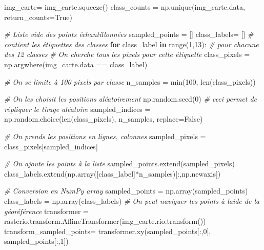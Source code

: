 \documentclass[
]{article}
\newenvironment{Shaded}{}{}
\newcommand{\BuiltInTok}[1]{\textcolor[rgb]{0.00,0.50,0.00}{#1}}
\newcommand{\CommentTok}[1]{\textcolor[rgb]{0.38,0.63,0.69}{\textit{#1}}}
\newcommand{\ControlFlowTok}[1]{\textcolor[rgb]{0.00,0.44,0.13}{\textbf{#1}}}
\newcommand{\DecValTok}[1]{\textcolor[rgb]{0.25,0.63,0.44}{#1}}
\newcommand{\KeywordTok}[1]{\textcolor[rgb]{0.00,0.44,0.13}{\textbf{#1}}}
\newcommand{\NormalTok}[1]{#1}
\newcommand{\OperatorTok}[1]{\textcolor[rgb]{0.40,0.40,0.40}{#1}}
\newcommand{\VariableTok}[1]{\textcolor[rgb]{0.10,0.09,0.49}{#1}}
\begin{document}
\label{a061c0ea}
\label{cb11}
\begin{Shaded}
\begin{Highlighting}[]
\NormalTok{img\_carte}\OperatorTok{=}\NormalTok{ img\_carte.squeeze()}
\NormalTok{class\_counts }\OperatorTok{=}\NormalTok{ np.unique(img\_carte.data, return\_counts}\OperatorTok{=}\VariableTok{True}\NormalTok{)}

\CommentTok{\# Liste vide des points échantillonnées}
\NormalTok{sampled\_points }\OperatorTok{=}\NormalTok{ []}
\NormalTok{class\_labels}\OperatorTok{=}\NormalTok{ [] }\CommentTok{\# contient les étiquettes des classes}
\ControlFlowTok{for}\NormalTok{ class\_label }\KeywordTok{in} \BuiltInTok{range}\NormalTok{(}\DecValTok{1}\NormalTok{,}\DecValTok{13}\NormalTok{): }\CommentTok{\# pour chacune des 12 classes}
  \CommentTok{\# On cherche tous les pixels pour cette étiquette}
\NormalTok{  class\_pixels }\OperatorTok{=}\NormalTok{ np.argwhere(img\_carte.data }\OperatorTok{==}\NormalTok{ class\_label)}

  \CommentTok{\# On se limite à 100 pixels par classe}
\NormalTok{  n\_samples }\OperatorTok{=} \BuiltInTok{min}\NormalTok{(}\DecValTok{100}\NormalTok{, }\BuiltInTok{len}\NormalTok{(class\_pixels))}

  \CommentTok{\# On les choisit les positions aléatoirement}
\NormalTok{  np.random.seed(}\DecValTok{0}\NormalTok{) }\CommentTok{\# ceci permet de répliquer le tirage aléatoire}
\NormalTok{  sampled\_indices }\OperatorTok{=}\NormalTok{ np.random.choice(}\BuiltInTok{len}\NormalTok{(class\_pixels), n\_samples, replace}\OperatorTok{=}\VariableTok{False}\NormalTok{)}

  \CommentTok{\# On prends les positions en lignes, colonnes}
\NormalTok{  sampled\_pixels }\OperatorTok{=}\NormalTok{ class\_pixels[sampled\_indices]}

  \CommentTok{\# On ajoute les points à la liste}
\NormalTok{  sampled\_points.extend(sampled\_pixels)}
\NormalTok{  class\_labels.extend(np.array([class\_label]}\OperatorTok{*}\NormalTok{n\_samples)[:,np.newaxis])}

\CommentTok{\# Conversion en NumPy array}
\NormalTok{sampled\_points }\OperatorTok{=}\NormalTok{ np.array(sampled\_points)}
\NormalTok{class\_labels }\OperatorTok{=}\NormalTok{ np.array(class\_labels)}
\CommentTok{\# On peut naviguer les points à l\textquotesingle{}aide de la géoréférence}
\NormalTok{transformer }\OperatorTok{=}\NormalTok{ rasterio.transform.AffineTransformer(img\_carte.rio.transform())}
\NormalTok{transform\_sampled\_points}\OperatorTok{=}\NormalTok{ transformer.xy(sampled\_points[:,}\DecValTok{0}\NormalTok{], sampled\_points[:,}\DecValTok{1}\NormalTok{])}


\end{Highlighting}
\end{Shaded}
\end{document}
